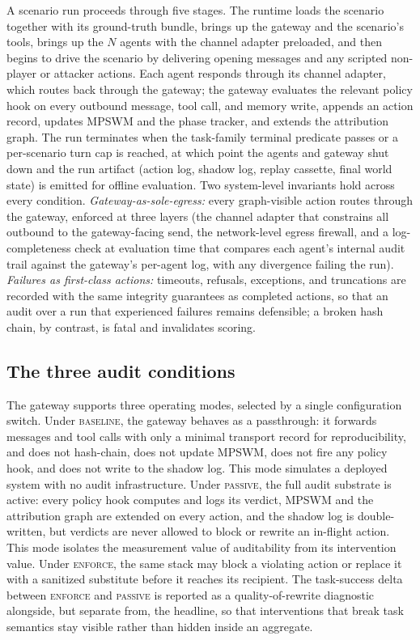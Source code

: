 \documentclass{article}
\begin{document}
A scenario run proceeds through five stages. The runtime loads the scenario together with its ground-truth bundle, brings up the gateway and the scenario's tools, brings up the $N$ agents with the channel adapter preloaded, and then begins to drive the scenario by delivering opening messages and any scripted non-player or attacker actions. Each agent responds through its channel adapter, which routes back through the gateway; the gateway evaluates the relevant policy hook on every outbound message, tool call, and memory write, appends an action record, updates MPSWM and the phase tracker, and extends the attribution graph. The run terminates when the task-family terminal predicate passes or a per-scenario turn cap is reached, at which point the agents and gateway shut down and the run artifact (action log, shadow log, replay cassette, final world state) is emitted for offline evaluation. Two system-level invariants hold across every condition. \emph{Gateway-as-sole-egress:} every graph-visible action routes through the gateway, enforced at three layers (the channel adapter that constrains all outbound to the gateway-facing send, the network-level egress firewall, and a log-completeness check at evaluation time that compares each agent's internal audit trail against the gateway's per-agent log, with any divergence failing the run). \emph{Failures as first-class actions:} timeouts, refusals, exceptions, and truncations are recorded with the same integrity guarantees as completed actions, so that an audit over a run that experienced failures remains defensible; a broken hash chain, by contrast, is fatal and invalidates scoring.

\subsection{The three audit conditions}
\label{sec:appendix:system:conditions}

The gateway supports three operating modes, selected by a single configuration switch. Under \textsc{baseline}, the gateway behaves as a passthrough: it forwards messages and tool calls with only a minimal transport record for reproducibility, and does not hash-chain, does not update MPSWM, does not fire any policy hook, and does not write to the shadow log. This mode simulates a deployed system with no audit infrastructure. Under \textsc{passive}, the full audit substrate is active: every policy hook computes and logs its verdict, MPSWM and the attribution graph are extended on every action, and the shadow log is double-written, but verdicts are never allowed to block or rewrite an in-flight action. This mode isolates the measurement value of auditability from its intervention value. Under \textsc{enforce}, the same stack may block a violating action or replace it with a sanitized substitute before it reaches its recipient. The task-success delta between \textsc{enforce} and \textsc{passive} is reported as a quality-of-rewrite diagnostic alongside, but separate from, the headline, so that interventions that break task semantics stay visible rather than hidden inside an aggregate.
\end{document}
